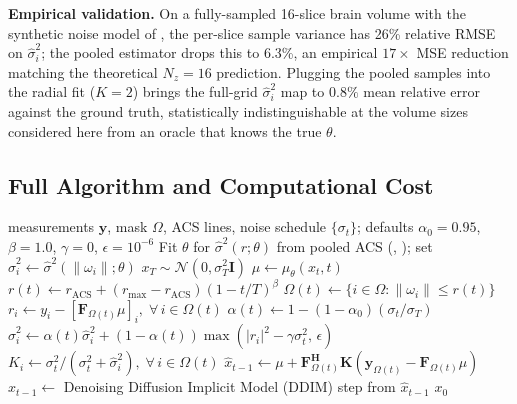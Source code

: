 \documentclass[conference]{IEEEtran}
\newcommand{\hatsig}{\hat{\sigma}}
\newcommand{\muth}{\mu_\theta}
\begin{document}
\textbf{Empirical validation.} On a fully-sampled 16-slice brain volume
with the synthetic noise model of , the per-slice
sample variance has 26\% relative RMSE on $\hatsig_i^2$; the pooled
estimator drops this to 6.3\%, an empirical $17\times$ MSE reduction
matching the theoretical $N_z\!=\!16$ prediction. Plugging the pooled
samples into the radial fit  ($K{=}2$) brings the
full-grid $\hatsig_i^2$ map to $0.8\%$ mean relative error against the
ground truth, statistically indistinguishable at the volume sizes
considered here from an oracle that knows the true $\theta$.

\subsection{Full Algorithm and Computational Cost}

\begin{algorithm}[t]
\caption{FA-KGD with FPDC}
\label{alg:fakgd}
\begin{algorithmic}[1]
\REQUIRE measurements $\mathbf{y}$, mask $\Omega$, ACS lines,
         noise schedule $\{\sigma_t\}$; defaults $\alpha_0{=}0.95$,
         $\beta{=}1.0$, $\gamma{=}0$, $\epsilon{=}10^{-6}$
\STATE Fit $\theta$ for $\hatsig^2(r;\theta)$ from pooled ACS
         (, ); set
         $\hatsig_i^2\!\leftarrow\!\hatsig^2(\|\omega_i\|;\theta)$
\STATE $x_T \sim \mathcal{N}(0, \sigma_T^2\mathbf{I})$
  \STATE $\mu \leftarrow \muth(x_t, t)$ \hfill{}
  \STATE $r(t) \leftarrow r_{\text{ACS}} + (r_{\max}{-}r_{\text{ACS}})
         (1{-}t/T)^\beta$ \hfill{}
  \STATE $\Omega(t) \leftarrow \{i \in \Omega : \|\omega_i\| \leq r(t)\}$
  \STATE $r_i \leftarrow y_i - [\mathbf{F}_{\Omega(t)}\mu]_i,
         \;\forall\, i \in \Omega(t)$
  \STATE $\alpha(t) \leftarrow 1 - (1{-}\alpha_0)(\sigma_t/\sigma_T)$
  \STATE $\hatsig_i^2 \leftarrow \alpha(t)\hatsig_i^2 +
         (1{-}\alpha(t))\max(|r_i|^2 {-} \gamma\sigma_t^2,\,\epsilon)$
         \hfill{}
  \STATE $K_i \leftarrow \sigma_t^2/(\sigma_t^2 + \hatsig_i^2),
         \;\forall\, i \in \Omega(t)$
  \STATE $\hat{x}_{t-1} \leftarrow \mu +
         \mathbf{F}_{\Omega(t)}^\mathbf{H}\mathbf{K}
         (\mathbf{y}_{\Omega(t)} - \mathbf{F}_{\Omega(t)}\mu)$
         \hfill{}
  \STATE $x_{t-1} \leftarrow$ Denoising Diffusion Implicit Model (DDIM) step from $\hat{x}_{t-1}$
\ENDFOR
\RETURN $x_0$
\end{algorithmic}
\end{algorithm}
\end{document}
